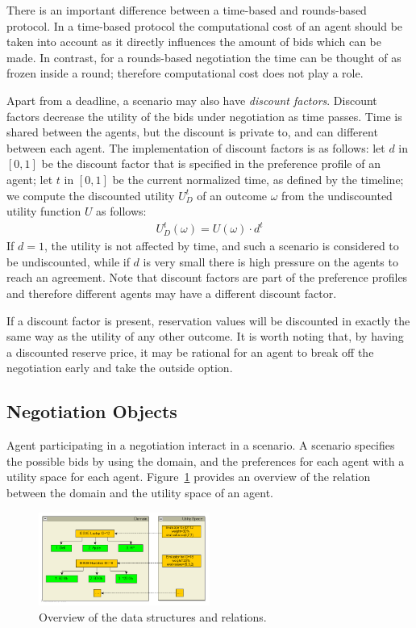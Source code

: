 \documentclass[]{article}
\begin{document}
There is an important difference between a time-based and rounds-based protocol. In a time-based protocol the computational cost of an agent should be taken into account as it directly influences the amount of bids which can be made. In contrast, for a rounds-based negotiation the time can be thought of as frozen inside a round; therefore computational cost does not play a role.

Apart from a deadline, a scenario may also have \emph{discount factors}. Discount factors decrease the utility of the bids under negotiation as time passes. Time is shared between the agents, but the discount is private to, and can different between each agent. The implementation of discount factors is as follows: let $d$ in $[0, 1]$ be the discount factor that is specified in the preference profile of an agent; let $t$ in $[0, 1]$ be the current normalized time, as defined by the timeline; we compute the discounted utility $U_D^t$ of an outcome $\omega$ from the undiscounted utility function $U$ as follows:
\begin{eqnarray}
U_D^t(\omega) = U(\omega) \cdot d^t
\end{eqnarray}
If $d = 1$, the utility is not affected by time, and such a scenario is considered to be undiscounted, while if $d$ is very small there is high pressure on the agents to reach an agreement. Note that discount factors are part of the preference profiles and therefore different agents may have a different discount factor.

If a discount factor is present, reservation values will be discounted in exactly the same way as the utility of any other outcome. It is worth noting that, by having a discounted reserve price, it may be rational for an agent to break off the negotiation early and take the outside option.

\subsection{Negotiation Objects}
Agent participating in a negotiation interact in a scenario. A scenario specifies the possible bids by using the domain, and the preferences for each agent with a utility space for each agent. Figure~\ref{Fig:overviewStructures} provides an overview of the relation between the domain and the utility space of an agent.

\begin{figure}[htb]
	\centering
	\includegraphics[width=0.5\textwidth]{media/datastructures.png}
	\caption{Overview of the data structures and relations.}\label{Fig:overviewStructures}
\end{figure}
\end{document}
